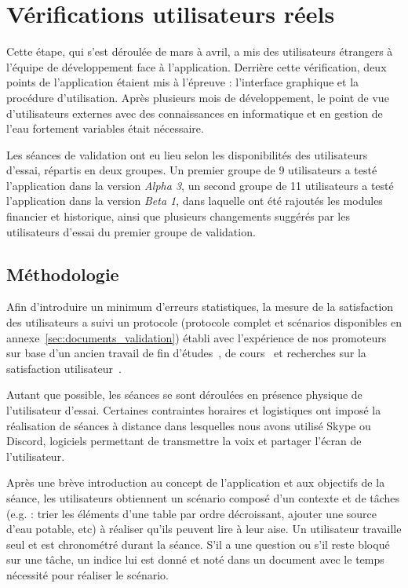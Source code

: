 \documentclass{EPL-master-thesis-covers-FR}
\begin{document}
		\section{Vérifications utilisateurs réels}
			Cette étape, qui s'est déroulée de mars à avril, a mis des utilisateurs étrangers à l'équipe de développement face à l'application. Derrière cette vérification, deux points de l'application étaient mis à l'épreuve : l'interface graphique et la procédure d'utilisation. Après plusieurs mois de développement, le point de vue d'utilisateurs externes avec des connaissances en informatique et en gestion de l'eau fortement variables était nécessaire.

			Les séances de validation ont eu lieu selon les disponibilités des utilisateurs d'essai, répartis en deux groupes. Un premier groupe de 9 utilisateurs a testé l'application dans la version \emph{Alpha 3}, un second groupe de 11 utilisateurs a testé l'application dans la version \emph{Beta 1}, dans laquelle  ont été rajoutés les modules financier et historique, ainsi que plusieurs changements suggérés par les utilisateurs d'essai du premier groupe de validation.

			\subsection*{Méthodologie}

				Afin d'introduire un minimum d'erreurs statistiques, la mesure de la satisfaction des utilisateurs a suivi un protocole (protocole complet et scénarios disponibles en annexe~\ref{sec:documents_validation}) établi avec l'expérience de nos promoteurs sur base d'un ancien travail de fin d'études~\cite{ref:reflecton}, de cours~\cite{ref:vanderdonckt_hci, ref:vanderdonckt_cscw} et recherches sur la satisfaction utilisateur~\cite{ref:usability_evaluation_tools, ref:ssi}.

				Autant que possible, les séances se sont déroulées en présence physique de l'utilisateur d'essai. Certaines contraintes horaires et logistiques ont imposé la réalisation de séances à distance dans lesquelles nous avons utilisé Skype ou Discord, logiciels permettant de transmettre la voix et partager l'écran de l'utilisateur.

				Après une brève introduction au concept de l'application et aux objectifs de la séance, les utilisateurs obtiennent un scénario composé d'un contexte et de tâches (e.g. : trier les éléments d'une table par ordre décroissant, ajouter une source d'eau potable, etc) à réaliser qu'ils peuvent lire à leur aise. Un utilisateur travaille seul et est chronométré durant la séance. S'il a une question ou s'il reste bloqué sur une tâche, un indice lui est donné et noté dans un document avec le temps nécessité pour réaliser le scénario.
\end{document}
